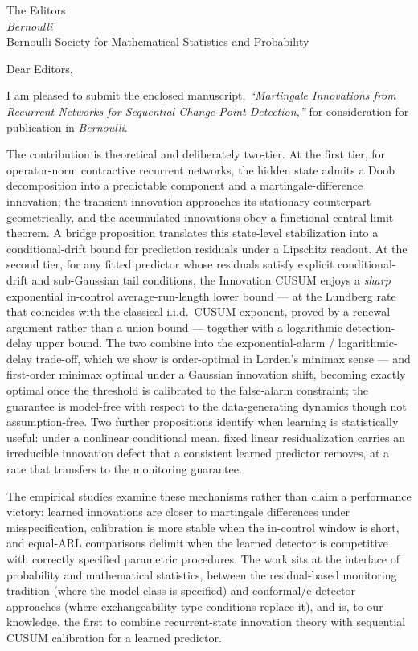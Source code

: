 \documentclass[11pt]{letter}
\begin{document}
\begin{letter}{The Editors\\ \textit{Bernoulli}\\ Bernoulli Society for
  Mathematical Statistics and Probability}

\opening{Dear Editors,}

I am pleased to submit the enclosed manuscript, \textit{``Martingale
Innovations from Recurrent Networks for Sequential Change-Point
Detection,''} for consideration for publication
in \textit{Bernoulli}.

The contribution is theoretical and deliberately two-tier.  At the first
tier, for operator-norm contractive recurrent networks, the hidden state
admits a Doob decomposition into a predictable component and a
martingale-difference innovation; the transient innovation approaches its
stationary counterpart geometrically, and the accumulated innovations obey
a functional central limit theorem.  A bridge proposition translates this
state-level stabilization into a conditional-drift bound for prediction
residuals under a Lipschitz readout.  At the second tier, for any fitted
predictor whose residuals satisfy explicit conditional-drift and
sub-Gaussian tail conditions, the Innovation CUSUM enjoys a \emph{sharp}
exponential in-control average-run-length lower bound --- at the Lundberg
rate that coincides with the classical i.i.d.\ CUSUM exponent, proved by a
renewal argument rather than a union bound --- together with a logarithmic
detection-delay upper bound.  The two combine into the exponential-alarm /
logarithmic-delay trade-off, which we show is order-optimal in Lorden's
minimax sense --- and first-order minimax optimal under a Gaussian innovation
shift, becoming exactly optimal once the threshold is calibrated to the
false-alarm constraint; the guarantee is model-free with respect to the
data-generating dynamics though not assumption-free.  Two further propositions identify when learning is
statistically useful: under a nonlinear conditional mean, fixed linear
residualization carries an irreducible innovation defect that a consistent
learned predictor removes, at a rate that transfers to the monitoring
guarantee.

The empirical studies examine these mechanisms rather than claim a
performance victory: learned innovations are closer to martingale
differences under misspecification, calibration is more stable when the
in-control window is short, and equal-ARL comparisons delimit when the
learned detector is competitive with correctly specified parametric
procedures.  The work sits at the interface of probability and
mathematical statistics, between the residual-based monitoring tradition
(where the model class is specified) and conformal/e-detector approaches
(where exchangeability-type conditions replace it), and is, to our
knowledge, the first to combine recurrent-state innovation theory with
sequential CUSUM calibration for a learned predictor.


\end{letter}
\end{document}
